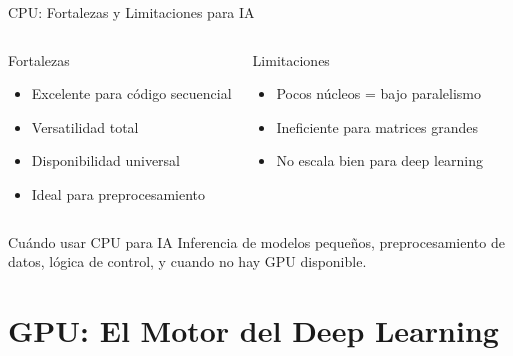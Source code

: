 \documentclass[aspectratio=169]{beamer}
\begin{document}
\begin{frame}{CPU: Fortalezas y Limitaciones para IA}
    \begin{columns}[t]
        \begin{block}{Fortalezas \faThumbsUp}
            \begin{itemize}
                \item Excelente para código secuencial
                \item Versatilidad total
                \item Disponibilidad universal
                \item Ideal para preprocesamiento
            \end{itemize}
        \end{block}
        
        \begin{alertblock}{Limitaciones \faThumbsDown}
            \begin{itemize}
                \item Pocos núcleos = bajo paralelismo
                \item Ineficiente para matrices grandes
                \item No escala bien para deep learning
            \end{itemize}
        \end{alertblock}
    \end{columns}
    
    \vspace{0.3cm}
    \begin{exampleblock}{Cuándo usar CPU para IA}
        Inferencia de modelos pequeños, preprocesamiento de datos, lógica de control, y cuando no hay GPU disponible.
    \end{exampleblock}
\end{frame}

\section{GPU: El Motor del Deep Learning}
\end{document}
